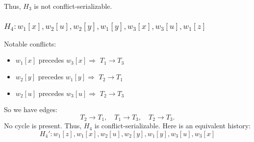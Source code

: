 \documentclass{article}
\begin{document}
Thus, $H_3$ is not conflict-serializable.

\subsubsection*{$H_4: w_1[x],w_2[u],w_2[y],w_1[y],w_3[x],w_3[u],w_1[z]$}
Notable conflicts:
\begin{itemize}
  \item $w_1[x]$ precedes $w_3[x]\Rightarrow$ $T_1 \to T_3$
  \item $w_2[y]$ precedes $w_1[y]\Rightarrow$ $T_2 \to T_1$
  \item $w_2[u]$ precedes $w_3[u]\Rightarrow$ $T_2 \to T_3$
\end{itemize}

So we have edges:
$$
  T_2 \to T_1,\quad
  T_1 \to T_3,\quad
  T_2 \to T_3.
$$
No cycle is present. Thus, $H_4$ is conflict-serializable. Here is an equivalent history:
$$
  \boxed{H_4': w_1[z],w_1[x],w_2[u],w_2[y],w_1[y],w_3[u],w_3[x]}
$$

\newpage
\end{document}
